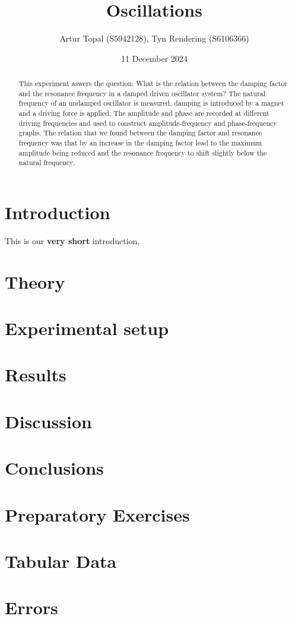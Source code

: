 \documentclass[a4paper,12pt]{article}
\title{Oscillations}
\author{Artur Topal (S5942128), Tyn Rendering (S6106366)}
\date{11 December 2024}
\begin{document}
\maketitle

\begin{abstract}
This experiment aswers the question: What is the relation between the damping factor and the resonance frequency in a damped driven oscillator system? The natural frequency of an undamped oscillator is measured, damping is introduced by a magnet and a driving force is applied. The amplitude and phase are recorded at different driving frequencies and used to construct amplitude-frequency and phase-frequency graphs. The relation that we found between the damping factor and resonance frequency was that by an increase in the damping factor lead to the maximum amplitude being reduced and the resonance frequency to shift slightly below the natural frequency.
\end{abstract}

\section{Introduction}
This is our \textbf{very short} introduction.

\section{Theory}


\section{Experimental setup}


\section{Results}


\section{Discussion}


\section{Conclusions}


\appendix
\section{Preparatory Exercises} \label{appendix:preps}

 
\section{Tabular Data} \label{appendix:data}


\section{Errors} \label{appendix:errors}

\end{document}
